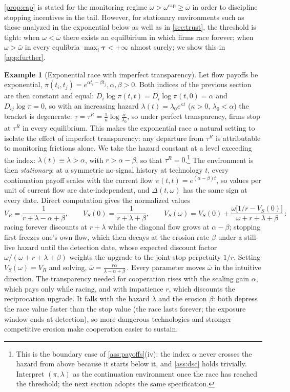 \documentclass[12pt,reqno]{article}
\theoremstyle{definition} \newtheorem{example}{Example}
\theoremstyle{definition} \newtheorem{condition}{Condition}
\theoremstyle{definition} \newtheorem{corollary}{Corollary}
\theoremstyle{definition} \newtheorem{claim}{Claim}
\theoremstyle{definition} \newtheorem{definition}{Definition}
\theoremstyle{definition} \newtheorem{conjecture}{Conjecture}
\theoremstyle{definition} \newtheorem{Lemma}{Lemma}
\theoremstyle{definition} \newtheorem{lemma}{Lemma}
\theoremstyle{plain} \newtheorem{theorem}{Theorem}
\theoremstyle{definition} \newtheorem{assumption}{Assumption}
\theoremstyle{definition} \newtheorem*{assumptionnonumber}{Assumption}
\theoremstyle{definition} \newtheorem*{theoremNoNumber}{Proposition}
\theoremstyle{definition}
\theoremstyle{definition}\newtheorem{proposition}{Proposition}
\theoremstyle{definition} \newtheorem{result}{Result}
\theoremstyle{definition} \newtheorem*{definitionNoNumber}{Definition}
\theoremstyle{definition} \newtheorem{Definition}{Definition}
\theoremstyle{definition} \newtheorem*{DefinitionNoNumber}{Definition}
\theoremstyle{definition} \newtheorem*{fact}{Fact}
\theoremstyle{definition} \newtheorem*{property}{Property}
\theoremstyle{definition} \newtheorem{remark}{Remark}
\begin{document}
\cref{prop:cap} is stated for the monitoring regime $\omega > \omega^{\mathrm{cap}} \geq \bar \omega$ in order to discipline stopping incentives in the tail. However, for stationary environments such as those analyzed in the exponential below as well as in \cref{sec:trust}, the threshold is tight: when $\omega < \bar \omega$ there exists an equilbirium in which firms race forever; when $\omega > \bar \omega$ in every equlibria $\max_i \bm{\tau} < +\infty$ almost surely; we show this in \cref{app:further}.



\begin{example}[Exponential race with imperfect transparency]\label{ex:exponential}
Let flow payoffs be exponential,
$
\pi(t_i,t_j)=e^{\alpha t_i-\beta t_j},\alpha,\beta>0$. 
Both indices of the previous section are then constant and equal: $D_i\log\pi(t,t)=D_i\log\pi(t,0)=\alpha$ and $D_{ij}\log\pi=0$, so with an increasing hazard $\lambda(t)=\lambda_0e^{\kappa t}$ ($\kappa>0$, $\lambda_0<\alpha$) the bracket is degenerate:
$
\underline\tau=\tau^R=\frac1\kappa\log\frac{\alpha}{\lambda_0}
$, 
so under perfect transparency, firms stop at $\tau^R$ in every equilibrium. This makes the exponential race a natural setting to isolate the effect of imperfect transparency: any departure from $\tau^R$ is attributable to monitoring frictions alone. We take the hazard constant at a level exceeding the index: $\lambda(t)\equiv\lambda>\alpha$, with $r>\alpha-\beta$, so that $\tau^R=0$.\footnote{This is the boundary case of \cref{ass:payoffs}(iv): the index $\alpha$ never crosses the hazard from above because it starts below it, and \cref{ass:dsc} holds trivially. Interpret $(\pi,\lambda)$ as the continuation environment once the race has reached the threshold; the next section adopts the same specification.} The environment is then \emph{stationary}: at a symmetric no-signal history at technology $t$, every continuation payoff scales with the current flow $\pi(t,t)=e^{(\alpha-\beta)t}$, so values per unit of current flow are date-independent, and $\Delta(t,\omega)$ has the same sign at every date. Direct computation gives the normalized  values
\[
V_R=\frac{1}{r+\lambda-\alpha+\beta},
\qquad
V_S(0)=\frac{1}{r+\lambda+\beta},
\qquad
V_S(\omega)=V_S(0)+\frac{\omega\big[1/r-V_S(0)\big]}{\omega+r+\lambda+\beta}\,:
\]
racing forever discounts at $r+\lambda$ while the diagonal flow grows at $\alpha-\beta$; stopping first freezes one's own flow, which then decays at the erosion rate $\beta$ under a still-live hazard until the detection date, whose expected discount factor $\omega/(\omega+r+\lambda+\beta)$ weights the upgrade to the joint-stop perpetuity $1/r$. Setting $V_S(\omega)=V_R$ and solving, $
\bar\omega=\frac{r\alpha}{\lambda-\alpha+\beta}\,.$
Every parameter moves $\bar\omega$ in the intuitive direction. The transparency needed for cooperation rises with the scaling gain $\alpha$, which pays only while racing, and with impatience $r$, which discounts the reciprocation upgrade. It falls with the hazard $\lambda$ and the erosion $\beta$: both depress the race value faster than the stop value (the race lasts forever; the exposure window ends at detection), so more dangerous technologies and stronger competitive erosion make cooperation easier to sustain.


\end{example}
\end{document}
